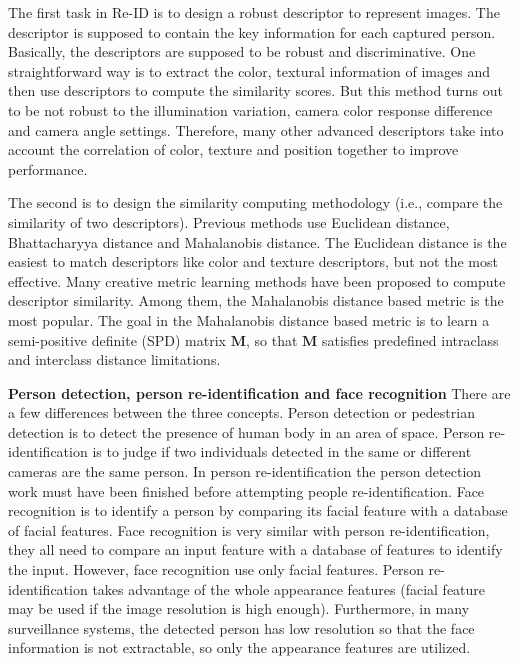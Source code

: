 The first task in Re-ID is to design a robust descriptor to represent images. The descriptor is supposed to contain the key information for each captured person. Basically, the descriptors are supposed to be robust and discriminative. One straightforward way is to extract the color, textural information of images and then use descriptors to compute the similarity scores. But this method turns out to be not robust to the illumination variation, camera color response difference and camera angle settings.  Therefore, many other advanced descriptors take into account the correlation of color, texture and position together to improve performance.

The second is to design the similarity computing methodology (i.e., compare the similarity of two descriptors). Previous methods use Euclidean distance, Bhattacharyya distance and Mahalanobis distance. The Euclidean distance is the easiest to match descriptors like color and texture descriptors, but not the most effective. Many creative metric learning methods have been proposed to compute descriptor similarity. Among them, the Mahalanobis distance based metric is the most popular. The goal in the Mahalanobis distance based metric is to learn a semi-positive definite (SPD) matrix $\bm{M}$, so that $\bm{M}$ satisfies predefined intraclass and interclass distance limitations.

\textbf{Person detection, person re-identification and face recognition} There are a few differences between the three concepts. Person detection or pedestrian detection is to detect the presence of human body in an area of space. Person re-identification is to judge if two individuals detected in the same or different cameras are the same person. In person re-identification the person detection work must have been finished before attempting people re-identification. Face recognition is to identify a person by comparing its facial feature with a database of facial features. Face recognition is very similar with person re-identification, they all need to compare an input feature with a database of features to identify the input. However, face recognition use only facial features. Person re-identification takes advantage of the whole appearance features (facial feature may be used if the image resolution is high enough). Furthermore, in many surveillance systems, the detected person has low resolution so that the face information is not extractable, so only the appearance features are utilized.
	
